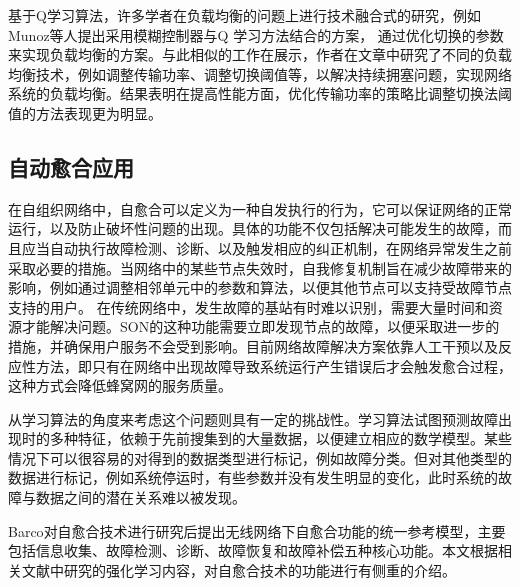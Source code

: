 \documentclass{IEEEtran}
\begin{document}
基于Q学习算法，许多学者在负载均衡的问题上进行技术融合式的研究，例如Munoz等人\cite{Munoz2011}提出采用模糊控制器与Q 学习方法结合的方案， 通过优化切换的参数来实现负载均衡的方案。与此相似的工作在\cite{Munoz2013}展示，作者在文章中研究了不同的负载均衡技术，例如调整传输功率、调整切换阈值等，以解决持续拥塞问题，实现网络系统的负载均衡。结果表明在提高性能方面，优化传输功率的策略比调整切换法阈值的方法表现更为明显。





%
%


\subsection{自动愈合应用}

在自组织网络中，自愈合可以定义为一种自发执行的行为，它可以保证网络的正常运行，以及防止破坏性问题的出现。具体的功能不仅包括解决可能发生的故障，而且应当自动执行故障检测、诊断、以及触发相应的纠正机制，在网络异常发生之前采取必要的措施。当网络中的某些节点失效时，自我修复机制旨在减少故障带来的影响，例如通过调整相邻单元中的参数和算法，以便其他节点可以支持受故障节点支持的用户。 在传统网络中，发生故障的基站有时难以识别，需要大量时间和资源才能解决问题。SON的这种功能需要立即发现节点的故障，以便采取进一步的措施，并确保用户服务不会受到影响。目前网络故障解决方案依靠人工干预以及反应性方法，即只有在网络中出现故障导致系统运行产生错误后才会触发愈合过程，这种方式会降低蜂窝网的服务质量。

从学习算法的角度来考虑这个问题则具有一定的挑战性。学习算法试图预测故障出现时的多种特征，依赖于先前搜集到的大量数据，以便建立相应的数学模型。某些情况下可以很容易的对得到的数据类型进行标记，例如故障分类。但对其他类型的数据进行标记，例如系统停运时，有些参数并没有发生明显的变化，此时系统的故障与数据之间的潜在关系难以被发现。

Barco\cite{Barco2012}对自愈合技术进行研究后提出无线网络下自愈合功能的统一参考模型，主要包括信息收集、故障检测、诊断、故障恢复和故障补偿五种核心功能。本文根据相关文献中研究的强化学习内容，对自愈合技术的功能进行有侧重的介绍。
\end{document}
